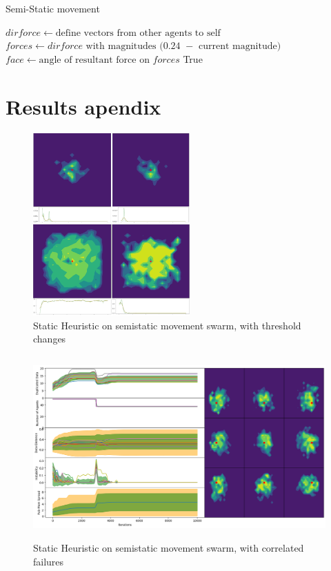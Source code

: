 \documentclass{UoYCSproject}
\begin{document}
\begin{algorithm}
\caption{Semi-Static movement}
\label{semistaticmove}
\begin{algorithmic}[1]
\State $dirforce \gets \text{define vectors from other agents to self}$
\State $forces \gets \text{$dirforce$ with magnitudes $($0.24 $-$ current magnitude$)$}$
\State
\State {}
\State
\State $face \gets \text{angle of resultant force on $forces$}$
\State {}
\State
\State \Return True
\EndProcedure
\end{algorithmic}
\end{algorithm}



\chapter{Results apendix}

\begin{figure}[htb]
\label{fig:Threshold_Changes}
\begin{center}
\centering
\includegraphics[height=7cm]{"./Static_Heuristic/Threshold_Changes.png"}
\caption{Static Heuristic on semi\-static movement swarm, with threshold changes}
\end{center}
\end{figure}

\begin{figure}[htb]
\label{fig:static_movement_con}
\begin{center}
\centering
\includegraphics[height=7cm]{"./Static_Heuristic/Static_Movement_concurrent.png"}
\caption{Static Heuristic on semi\-static movement swarm, with correlated failures}
\end{center}
\end{figure}
\end{document}
